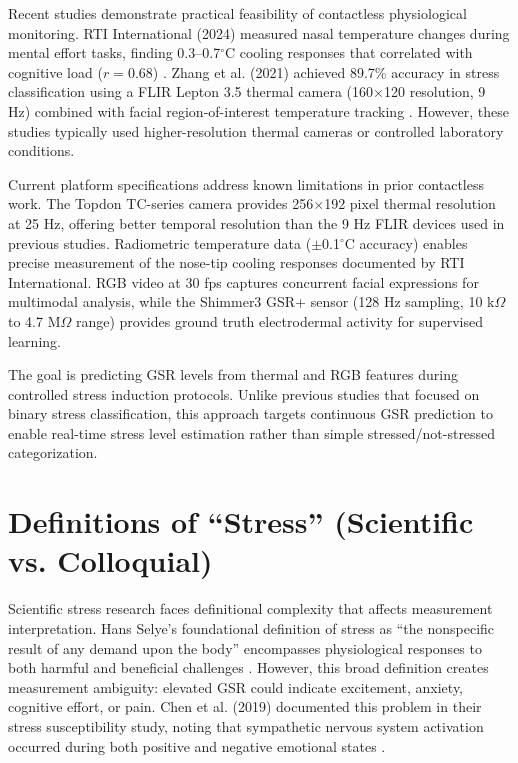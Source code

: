 Recent studies demonstrate practical feasibility of contactless physiological monitoring. RTI International (2024) measured nasal temperature changes during mental effort tasks, finding 0.3--0.7$^\circ$C cooling responses that correlated with cognitive load ($r = 0.68$) \cite{ref6}. Zhang et al. (2021) achieved 89.7\% accuracy in stress classification using a FLIR Lepton 3.5 thermal camera (160$\times$120 resolution, 9 Hz) combined with facial region-of-interest temperature tracking \cite{ref5}. However, these studies typically used higher-resolution thermal cameras or controlled laboratory conditions.

Current platform specifications address known limitations in prior contactless work. The Topdon TC-series camera provides 256$\times$192 pixel thermal resolution at 25 Hz, offering better temporal resolution than the 9 Hz FLIR devices used in previous studies. Radiometric temperature data ($\pm$0.1$^\circ$C accuracy) enables precise measurement of the nose-tip cooling responses documented by RTI International. RGB video at 30 fps captures concurrent facial expressions for multimodal analysis, while the Shimmer3 GSR+ sensor (128 Hz sampling, 10 k$\Omega$ to 4.7 M$\Omega$ range) provides ground truth electrodermal activity for supervised learning.

The goal is predicting GSR levels from thermal and RGB features during controlled stress induction protocols. Unlike previous studies that focused on binary stress classification, this approach targets continuous GSR prediction to enable real-time stress level estimation rather than simple stressed/not-stressed categorization.

\section{Definitions of ``Stress'' (Scientific vs. Colloquial)}
Scientific stress research faces definitional complexity that affects measurement interpretation. Hans Selye's foundational definition of stress as ``the nonspecific result of any demand upon the body'' encompasses physiological responses to both harmful and beneficial challenges \cite{ref11}. However, this broad definition creates measurement ambiguity: elevated GSR could indicate excitement, anxiety, cognitive effort, or pain. Chen et al. (2019) documented this problem in their stress susceptibility study, noting that sympathetic nervous system activation occurred during both positive and negative emotional states \cite{ref4}.

